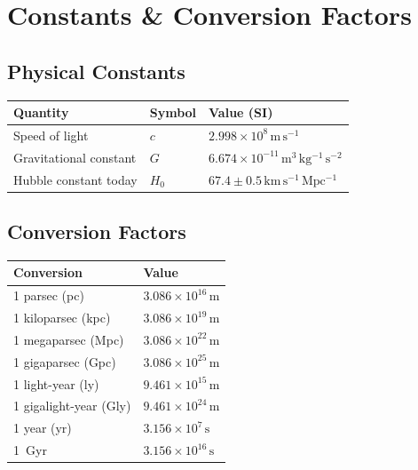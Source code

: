 \clearpage


\chapter{Constants \& Conversion Factors}

\section{Physical Constants}

\begin{center}
\begin{tabular}{lll}
\toprule
\textbf{Quantity} & \textbf{Symbol} & \textbf{Value (SI)} \\
\midrule
Speed of light         & $c$       & $2.998 \times 10^8 \,\mathrm{m\,s^{-1}}$           \\
Gravitational constant & $G$       & $6.674 \times 10^{-11} \,\mathrm{m^3\,kg^{-1}\,s^{-2}}$ \\
Hubble constant today  & $H_0$     & $67.4 \pm 0.5 \,\mathrm{km\,s^{-1}\,Mpc^{-1}}$     \\
\bottomrule
\end{tabular}
\end{center}

\section{Conversion Factors}

\begin{center}
\begin{tabular}{ll}
\toprule
\textbf{Conversion} & \textbf{Value} \\
\midrule
1 parsec (pc)       & $3.086\times10^{16}\,\mathrm{m}$ \\
1 kiloparsec (kpc)  & $3.086\times10^{19}\,\mathrm{m}$ \\
1 megaparsec (Mpc)  & $3.086\times10^{22}\,\mathrm{m}$ \\
1 gigaparsec (Gpc)  & $3.086\times10^{25}\,\mathrm{m}$ \\
1 light-year (ly)   & $9.461\times10^{15}\,\mathrm{m}$ \\
1 gigalight-year (Gly) & $9.461\times10^{24}\,\mathrm{m}$ \\
1 year (yr)         & $3.156\times10^{7}\,\mathrm{s}$ \\
1~Gyr               & $3.156\times10^{16}\,\mathrm{s}$ \\
\bottomrule
\end{tabular}
\end{center}

\clearpage
